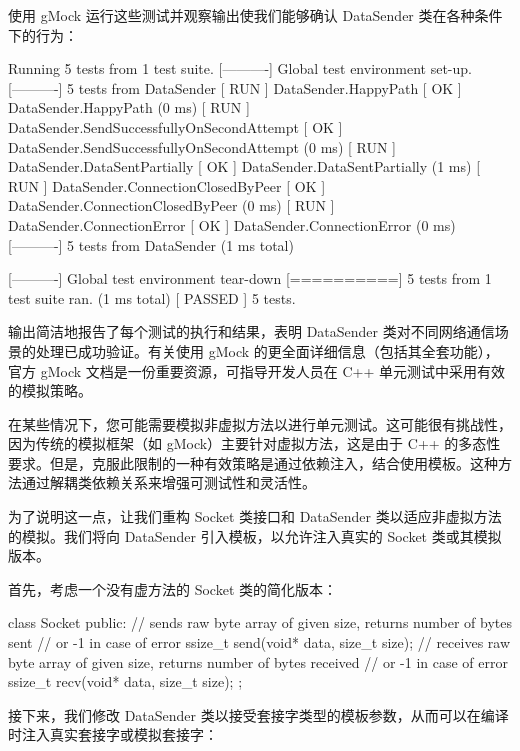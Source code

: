 使用 gMock 运行这些测试并观察输出使我们能够确认 DataSender 类在各种条件下的行为：

\begin{shell}
[==========] Running 5 tests from 1 test suite.
[----------] Global test environment set-up.
[----------] 5 tests from DataSender
[ RUN ] DataSender.HappyPath
[ OK ] DataSender.HappyPath (0 ms)
[ RUN ] DataSender.SendSuccessfullyOnSecondAttempt
[ OK ] DataSender.SendSuccessfullyOnSecondAttempt (0 ms)
[ RUN ] DataSender.DataSentPartially
[ OK ] DataSender.DataSentPartially (1 ms)
[ RUN ] DataSender.ConnectionClosedByPeer
[ OK ] DataSender.ConnectionClosedByPeer (0 ms)
[ RUN ] DataSender.ConnectionError
[ OK ] DataSender.ConnectionError (0 ms)
[----------] 5 tests from DataSender (1 ms total)

[----------] Global test environment tear-down
[==========] 5 tests from 1 test suite ran. (1 ms total)
[ PASSED ] 5 tests.
\end{shell}

输出简洁地报告了每个测试的执行和结果，表明 DataSender 类对不同网络通信场景的处理已成功验证。有关使用 gMock 的更全面详细信息（包括其全套功能），官方 gMock 文档是一份重要资源，可指导开发人员在 C++ 单元测试中采用有效的模拟策略。


在某些情况下，您可能需要模拟非虚拟方法以进行单元测试。这可能很有挑战性，因为传统的模拟框架（如 gMock）主要针对虚拟方法，这是由于 C++ 的多态性要求。但是，克服此限制的一种有效策略是通过依赖注入，结合使用模板。这种方法通过解耦类依赖关系来增强可测试性和灵活性。


为了说明这一点，让我们重构 Socket 类接口和 DataSender 类以适应非虚拟方法的模拟。我们将向 DataSender 引入模板，以允许注入真实的 Socket 类或其模拟版本。

首先，考虑一个没有虚方法的 Socket 类的简化版本：

\begin{cpp}
class Socket {
    public:
    // sends raw byte array of given size, returns number of bytes sent
    // or -1 in case of error
    ssize_t send(void* data, size_t size);
    // receives raw byte array of given size, returns number of bytes received
    // or -1 in case of error
    ssize_t recv(void* data, size_t size);
};
\end{cpp}

接下来，我们修改 DataSender 类以接受套接字类型的模板参数，从而可以在编译时注入真实套接字或模拟套接字：

